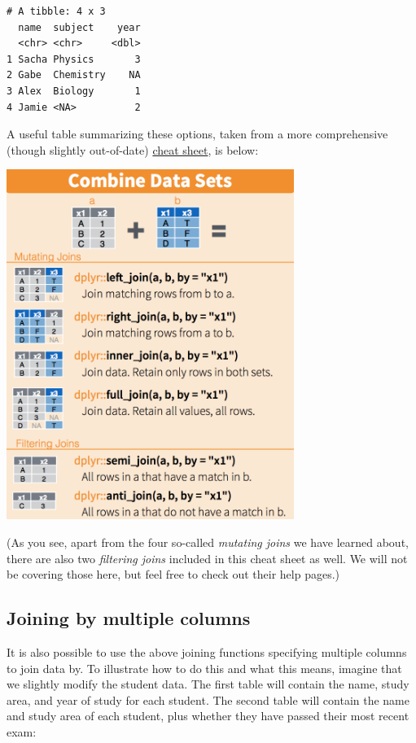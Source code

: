 \documentclass[
  letterpaper,
  DIV=11,
  numbers=noendperiod]{scrreprt}
\begin{document}
\begin{verbatim}
# A tibble: 4 x 3
  name  subject    year
  <chr> <chr>     <dbl>
1 Sacha Physics       3
2 Gabe  Chemistry    NA
3 Alex  Biology       1
4 Jamie <NA>          2
\end{verbatim}

A useful table summarizing these options, taken from a more
comprehensive (though slightly out-of-date)
\href{https://www.rstudio.com/wp-content/uploads/2015/02/data-wrangling-cheatsheet.pdf}{cheat
sheet}, is below:

\includegraphics[width=0.7\textwidth,height=\textheight]{joins.png}

(As you see, apart from the four so-called \emph{mutating joins} we have
learned about, there are also two \emph{filtering joins} included in
this cheat sheet as well. We will not be covering those here, but feel
free to check out their help pages.)

\hypertarget{joining-by-multiple-columns}{%
\subsection{Joining by multiple
columns}\label{joining-by-multiple-columns}}

It is also possible to use the above joining functions specifying
multiple columns to join data by. To illustrate how to do this and what
this means, imagine that we slightly modify the student data. The first
table will contain the name, study area, and year of study for each
student. The second table will contain the name and study area of each
student, plus whether they have passed their most recent exam:
\end{document}
